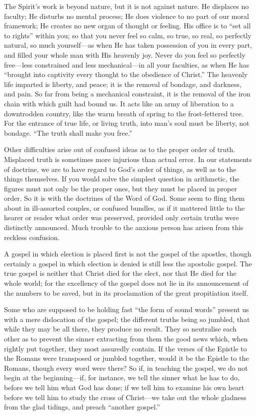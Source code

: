\documentclass[
]{book}
\begin{document}
The Spirit's work is beyond nature, but it is not against nature. He displaces no faculty; He disturbs no mental process; He does violence to no part of our moral framework; He creates no new organ of thought or feeling. His office is to ``set all to rights'' within you; so that you never feel so calm, so true, so real, so perfectly natural, so much yourself---as when He has taken possession of you in every part, and filled your whole man with His heavenly joy. Never do you feel so perfectly free---less constrained and less mechanical---in all your faculties, as when He has ``brought into captivity every thought to the obedience of Christ.'' The heavenly life imparted is liberty, and peace; it is the removal of bondage, and darkness, and pain. So far from being a mechanical constraint, it is the removal of the iron chain with which guilt had bound us. It acts like an army of liberation to a downtrodden country, like the warm breath of spring to the frost-fettered tree. For the entrance of true life, or living truth, into man's soul must be liberty, not bondage. ``The truth shall make you free.''

Other difficulties arise out of confused ideas as to the proper order of truth. Misplaced truth is sometimes more injurious than actual error. In our statements of doctrine, we are to have regard to God's order of things, as well as to the things themselves. If you would solve the simplest question in arithmetic, the figures must not only be the proper ones, but they must be placed in proper order. So it is with the doctrines of the Word of God. Some seem to fling them about in ill-assorted couples, or confused bundles, as if it mattered little to the hearer or reader what order was preserved, provided only certain truths were distinctly announced. Much trouble to the anxious person has arisen from this reckless confusion.

A gospel in which election is placed first is not the gospel of the apostles, though certainly a gospel in which election is denied is still less the apostolic gospel. The true gospel is neither that Christ died for the elect, nor that He died for the whole world; for the excellency of the gospel does not lie in its announcement of the numbers to be saved, but in its proclamation of the great propitiation itself.

Some who are supposed to be holding fast ``the form of sound words'' present us with a mere dislocation of the gospel; the different truths being so jumbled, that while they may be all there, they produce no result. They so neutralise each other as to prevent the sinner extracting from them the good news which, when rightly put together, they most assuredly contain. If the verses of the Epistle to the Romans were transposed or jumbled together, would it be the Epistle to the Romans, though every word were there? So if, in teaching the gospel, we do not begin at the beginning---if, for instance, we tell the sinner what he has to do, before we tell him what God has done; if we tell him to examine his own heart before we tell him to study the cross of Christ---we take out the whole gladness from the glad tidings, and preach ``another gospel.''
\end{document}

